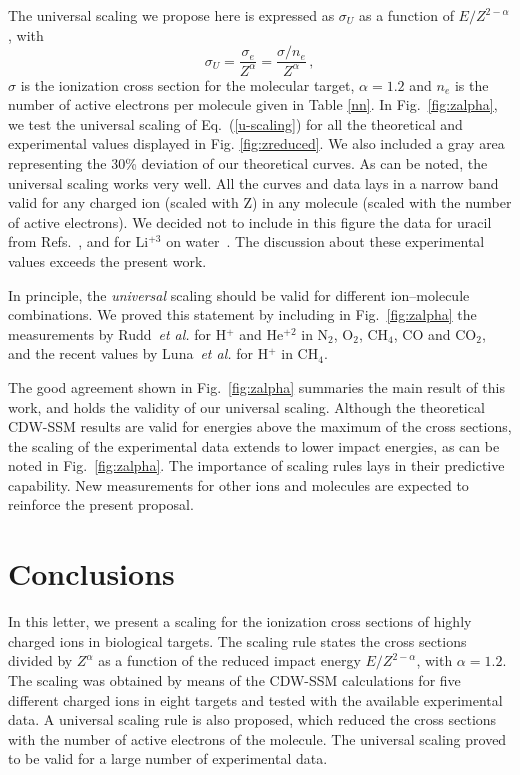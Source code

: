 \documentclass[10pt,showpacs,showkeys,twocolumn]{revtex4-1}
\begin{document}
The universal scaling we propose here is expressed as $\sigma_U$ as a 
function of $E/Z^{2-\alpha}$, with
 \begin{equation}
     \sigma_U=\frac{\sigma_e}{Z^{\alpha}}=\frac{\sigma/n_e}{Z^{\alpha}}\,,
     \label{u-scaling}
 \end{equation}
$\sigma$ is the ionization cross section for the molecular target, 
$\alpha=1.2$ and $n_e$ is the number of active electrons per molecule 
given in Table \ref{nn}. In Fig.~\ref{fig:zalpha}, we test the universal 
scaling of Eq.~(\ref{u-scaling}) for all the theoretical and 
experimental values displayed in Fig. \ref{fig:zreduced}. We also 
included a gray area representing the 30\% deviation of our theoretical 
curves. As can be noted, the universal scaling works very well. All the 
curves and data lays in a narrow band valid for any charged ion (scaled 
with Z) in any molecule (scaled with the number of active electrons). 
We decided not to include in this figure the data for uracil from 
Refs.~\cite{agnihotri2012,agnihotri2013}, and for Li$^{+3}$ on 
water~\cite{Luna_Li_water}. The discussion about these experimental 
values exceeds the present work. %

In principle, the \textit{universal} scaling should be valid for 
different ion--molecule combinations. We proved this statement by 
including in Fig.~\ref{fig:zalpha} the measurements by 
Rudd~\textit{et al.} \cite{Rudd85,Rudd1983} for H$^{+}$ and He$^{+2}$ 
in N$_2$, O$_2$, CH$_4$, CO and CO$_2$, and the recent values by 
Luna~\textit{et al.} \cite{Luna2019} for H$^{+}$ in CH$_4$. 

The good agreement shown in Fig.~\ref{fig:zalpha} summaries the main 
result of this work, and holds the validity of our universal scaling. 
Although the theoretical CDW-SSM results are valid for energies above 
the maximum of the cross sections, the scaling of the experimental data 
extends to lower impact energies, as can be noted in 
Fig.~\ref{fig:zalpha}. The importance of scaling rules lays in their 
predictive capability. New measurements for other ions and molecules 
are expected to reinforce the present proposal. 

\section{Conclusions}
In this letter, we present a scaling for the ionization cross sections 
of highly charged ions in biological targets. The scaling rule states 
the cross sections divided by $Z^{\alpha}$ as a function of the reduced 
impact energy $E/Z^{2-\alpha}$, with $\alpha=1.2$. The scaling was 
obtained by means of the CDW-SSM calculations for five different charged 
ions in eight targets and tested with the available experimental data. 
A universal scaling rule  is also proposed, which reduced the cross 
sections with the number of active electrons of the molecule. The 
universal scaling proved to be valid for a large number of experimental 
data.
\end{document}
